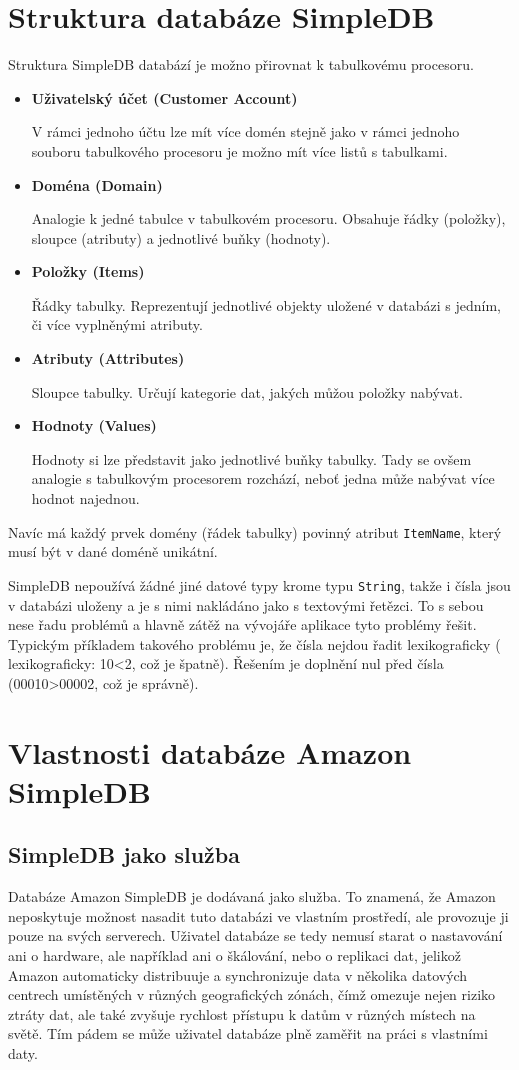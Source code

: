 \documentclass[oneside,11pt]{fithesis2}
\begin{document}
\section{Struktura databáze SimpleDB}
Struktura SimpleDB databází je možno přirovnat k tabulkovému procesoru.
\begin{itemize}
 \item \textbf{Uživatelský účet (Customer Account)}
 
 V rámci jednoho účtu lze mít více domén stejně jako v rámci jednoho souboru tabulkového procesoru je možno mít více listů s tabulkami.
 \item \textbf{Doména (Domain)}
 
 Analogie k jedné tabulce v tabulkovém procesoru. Obsahuje řádky (položky), sloupce (atributy) a jednotlivé buňky (hodnoty).
 \item \textbf{Položky (Items)}
 
 Řádky tabulky. Reprezentují jednotlivé objekty uložené v databázi s jedním, či více vyplněnými atributy.
 \item \textbf{Atributy (Attributes)}
 
 Sloupce tabulky. Určují kategorie dat, jakých můžou položky nabývat.
 
 \item \textbf{Hodnoty (Values)}
 
 Hodnoty si lze představit jako jednotlivé buňky tabulky. Tady se ovšem analogie s tabulkovým procesorem rozchází, neboť jedna  může nabývat více hodnot najednou.
 
\end{itemize}
Navíc má každý prvek domény (řádek tabulky) povinný atribut \verb<ItemName<, který musí být v dané doméně unikátní.

SimpleDB nepoužívá žádné jiné datové typy krome typu \verb<String<, takže i čísla jsou v databázi uloženy a je s nimi nakládáno jako s textovými řetězci. To s sebou nese řadu problémů a hlavně zátěž na vývojáře aplikace tyto problémy řešit. Typickým příkladem takového problému je, že čísla nejdou řadit lexikograficky ( lexikograficky: 10<2, což je špatně). Řešením je doplnění nul před čísla (00010>00002, což je správně).

\section{Vlastnosti databáze Amazon SimpleDB}
\subsection*{SimpleDB jako služba}
Databáze Amazon SimpleDB je dodávaná jako služba. To znamená, že Amazon neposkytuje možnost nasadit tuto databázi ve vlastním prostředí, ale provozuje ji pouze na svých serverech. Uživatel databáze se tedy nemusí starat o nastavování ani o hardware, ale například ani o škálování, nebo o replikaci dat, jelikož Amazon automaticky distribuuje a synchronizuje data v několika datových centrech umístěných v různých geografických zónách, čímž omezuje nejen riziko ztráty dat, ale také zvyšuje rychlost přístupu k datům v různých místech na světě. Tím pádem se může uživatel databáze plně zaměřit na práci s vlastními daty.
\end{document}
